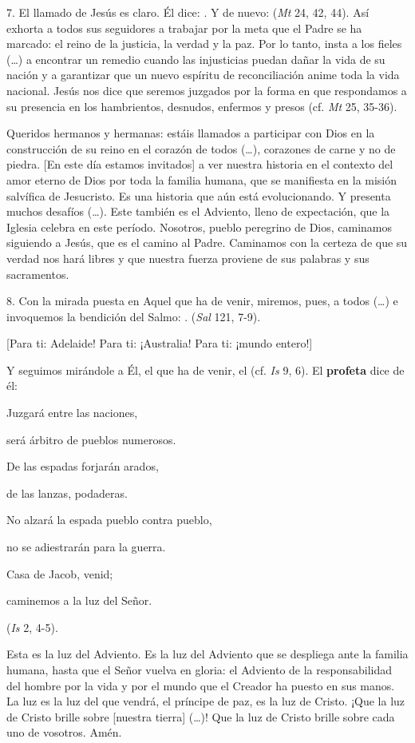 \begin{body}
	7. El llamado de Jesús es claro. Él dice: . Y de nuevo:  (\emph{Mt} 24, 42, 44). Así exhorta a todos sus seguidores a trabajar por la meta que el Padre se ha marcado: el reino de la justicia, la verdad y la paz. Por lo tanto, insta a los fieles (\ldots{}) a encontrar un remedio cuando las injusticias puedan dañar la vida de su nación y a garantizar que un nuevo espíritu de reconciliación anime toda la vida nacional. Jesús nos dice que seremos juzgados por la forma en que respondamos a su presencia en los hambrientos, desnudos, enfermos y presos (cf. \emph{Mt} 25, 35-36).

	Queridos hermanos y hermanas: estáis llamados a participar con Dios en la construcción de su reino en el corazón de todos (\ldots{}), corazones de carne y no de piedra. {[}En este día estamos invitados{]} a ver nuestra historia en el contexto del amor eterno de Dios por toda la familia humana, que se manifiesta en la misión salvífica de Jesucristo. Es una historia que aún está evolucionando. Y presenta muchos desafíos (\ldots{}). Este también es el Adviento, lleno de expectación, que la Iglesia celebra en este período. Nosotros, pueblo peregrino de Dios, caminamos siguiendo a Jesús, que es el camino al Padre. Caminamos con la certeza de que su verdad nos hará libres y que nuestra fuerza proviene de sus palabras y sus sacramentos.

	8. Con la mirada puesta en Aquel que ha de venir, miremos, pues, a todos (\ldots{}) e invoquemos la bendición del Salmo: . (\emph{Sal} 121, 7-9).

	{[}Para ti: Adelaide! Para ti: ¡Australia! Para ti: ¡mundo entero!{]}

	Y seguimos mirándole a Él, el que ha de venir, el  (cf. \emph{Is} 9, 6). El \textbf{profeta} dice de él:

	Juzgará entre las naciones,

	será árbitro de pueblos numerosos.

	De las espadas forjarán arados,

	de las lanzas, podaderas.

	No alzará la espada pueblo contra pueblo,

	no se adiestrarán para la guerra.

	Casa de Jacob, venid;

	caminemos a la luz del Señor.

	(\emph{Is} 2, 4-5).

	Esta es la luz del Adviento. Es la luz del Adviento que se despliega ante la familia humana, hasta que el Señor vuelva en gloria: el Adviento de la responsabilidad del hombre por la vida y por el mundo que el Creador ha puesto en sus manos. La luz es la luz del que vendrá, el príncipe de paz, es la luz de Cristo. ¡Que la luz de Cristo brille sobre {[}nuestra tierra{]} (\ldots{})! Que la luz de Cristo brille sobre cada uno de vosotros. Amén.
\end{body}

